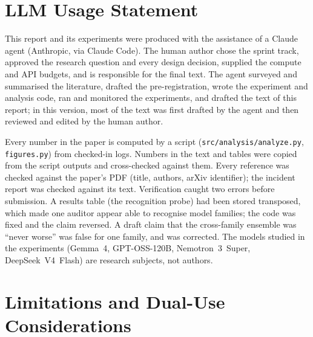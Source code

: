 \documentclass[11pt,letterpaper]{article}
\begin{document}
\section*{LLM Usage Statement}

This report and its experiments were produced with the assistance of a Claude agent (Anthropic, via Claude Code). The human author chose the sprint track, approved the research question and every design decision, supplied the compute and API budgets, and is responsible for the final text. The agent surveyed and summarised the literature, drafted the pre-registration, wrote the experiment and analysis code, ran and monitored the experiments, and drafted the text of this report; in this version, most of the text was first drafted by the agent and then reviewed and edited by the human author.

Every number in the paper is computed by a script (\texttt{src/analysis/analyze.py}, \texttt{figures.py}) from checked-in logs. Numbers in the text and tables were copied from the script outputs and cross-checked against them. Every reference was checked against the paper's PDF (title, authors, arXiv identifier); the incident report was checked against its text. Verification caught two errors before submission. A results table (the recognition probe) had been stored transposed, which made one auditor appear able to recognise model families; the code was fixed and the claim reversed. A draft claim that the cross-family ensemble was ``never worse'' was false for one family, and was corrected. The models studied in the experiments (Gemma~4, GPT-OSS-120B, Nemotron~3~Super, DeepSeek~V4~Flash) are research subjects, not authors.

\appendix
\renewcommand{\thesection}{\Alph{section}}
\titleformat{\section}{\Large}{Appendix \thesection\ ---}{0.45em}{}
\renewcommand{\thetable}{\thesection\arabic{table}}
\renewcommand{\thefigure}{\thesection\arabic{figure}}

\section{Limitations and Dual-Use Considerations}
\setcounter{table}{0}\setcounter{figure}{0}
\end{document}
